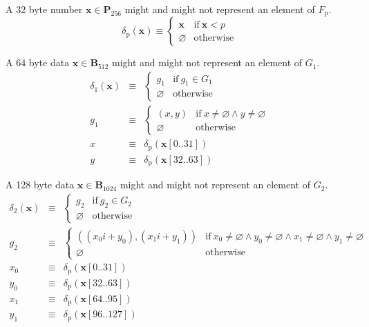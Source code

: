 \documentclass[9pt,oneside]{amsart}
\begin{document}
A 32 byte number $\mathbf{x}\in\mathbf{P}_{256}$ might and might not represent an element of $F_{\mathrm{p}}$.
\begin{equation}
\delta_{\mathrm{p}}(\mathbf{x})\equiv\begin{cases}
\mathbf{x}&\text{if}\ \mathbf{x}<p\\
\varnothing&\text{otherwise}
\end{cases}
\end{equation}

A 64 byte data $\mathbf{x}\in\mathbf{B}_{512}$ might and might not represent an element of $G_1$.
\begin{eqnarray}
\delta_1(\mathbf{x})&\equiv&\begin{cases}
g_1&\text{if}\ g_1\in G_1\\
\varnothing&\text{otherwise}
\end{cases}\\
g_1&\equiv&\begin{cases}
(x,y)&\text{if}\ x\neq\varnothing\wedge y\neq\varnothing\\
\varnothing&\text{otherwise}
\end{cases}\\
x&\equiv&\delta_{\mathrm{p}}(\mathbf{x}[0..31])\\
y&\equiv&\delta_{\mathrm{p}}(\mathbf{x}[32..63])
\end{eqnarray}

A 128 byte data $\mathbf{x}\in\mathbf{B}_{1024}$ might and might not represent an element of $G_2$.
\begin{eqnarray}
\delta_2(\mathbf{x})&\equiv&\begin{cases}
g_2&\text{if}\ g_2\in G_2\\
\varnothing&\text{otherwise}
\end{cases}\\
g_2&\equiv&\begin{cases}
((x_0i+y_0),(x_1i+y_1))&\text{if}\ x_0\neq\varnothing\wedge y_0\neq\varnothing\wedge x_1\neq\varnothing\wedge y_1\neq\varnothing\\
\varnothing&\text{otherwise}
\end{cases}\\
x_0&\equiv&\delta_{\mathrm{p}}(\mathbf{x}[0..31])\\
y_0&\equiv&\delta_{\mathrm{p}}(\mathbf{x}[32..63])\\
x_1&\equiv&\delta_{\mathrm{p}}(\mathbf{x}[64..95])\\
y_1&\equiv&\delta_{\mathrm{p}}(\mathbf{x}[96..127])
\end{eqnarray}
\end{document}
